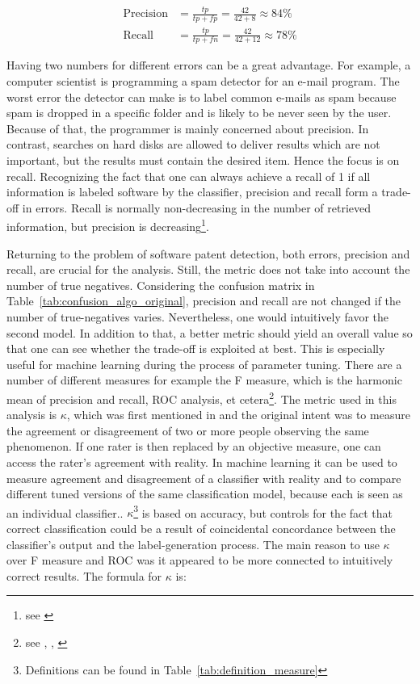 \documentclass[12pt, a4paper, abstract, parskip]{scrartcl}
\theoremstyle{definition}
\begin{document}
\begin{align*}
\text{Precision} &= \frac{tp}{tp + fp} = \frac{42}{42 + 8} \approx 84\% \\
\text{Recall} &= \frac{tp}{tp + fn} = \frac{42}{42 + 12} \approx 78\%
\end{align*}

Having two numbers for different errors can be a great advantage. For example,
a computer scientist is programming a spam detector for an e-mail program. The
worst error the detector can make is to label common e-mails as spam because
spam is dropped in a specific folder and is likely to be never seen by the
user. Because of that, the programmer is mainly concerned about precision. In
contrast, searches on hard disks are allowed to deliver results which are not
important, but the results must contain the desired item. Hence the focus is on
recall. Recognizing the fact that one can always achieve a recall of 1 if all
information is labeled software by the classifier, precision and recall form a
trade-off in errors. Recall is normally non-decreasing in the number of
retrieved information, but precision is decreasing\footnote{see
\citet[p.~156]{manning2008introduction}}.

Returning to the problem of software patent detection, both errors, precision
and recall, are crucial for the analysis. Still, the metric does not take into
account the number of true negatives. Considering the confusion matrix in
Table~\ref{tab:confusion_algo_original}, precision and recall are not changed
if the number of true-negatives varies. Nevertheless, one would intuitively
favor the second model. In addition to that, a better metric should yield an
overall value so that one can see whether the trade-off is exploited at best.
This is especially useful for machine learning during the process of parameter
tuning. There are a number of different measures for example the F measure,
which is the harmonic mean of precision and recall, ROC analysis, et
cetera\footnote{see \cite{manning2008introduction},
\cite{powers2011evaluation}, \cite{fawcett2006introduction}}. The metric used
in this analysis is $\kappa$, which was first mentioned in
\cite{cohen1960coefficient} and the original intent was to measure the
agreement or disagreement of two or more people observing the same phenomenon.
If one rater is then replaced by an objective measure, one can access the
rater's agreement with reality. In machine learning it can be used to measure
agreement and disagreement of a classifier with reality and to compare
different tuned versions of the same classification model, because each is seen
as an individual classifier.. $\kappa$\footnote{Definitions can be found in
Table~\ref{tab:definition_measure}} is based on accuracy, but controls for the
fact that correct classification could be a result of coincidental concordance
between the classifier's output and the label-generation process. The main
reason to use $\kappa$ over F measure and ROC was it appeared to be more
connected to intuitively correct results. The formula for $\kappa$ is:
\end{document}
